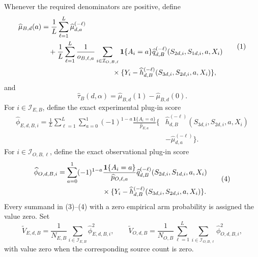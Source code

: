 Whenever the required denominators are positive, define
\[
\begin{aligned}
 \widehat\mu_{B,d}(a)
 &=\frac1L\sum_{\ell=1}^L\widehat\mu_{d,a}^{(-\ell)}\\
 &\quad+\frac1L\sum_{\ell=1}^L\frac1{o_{B,\ell,a}}
 \sum_{i\in\mathcal I_{O,B,\ell}}\mathbf 1\{A_i=a\}
 \widehat q_{d,B}^{(-\ell)}(S_{2d,i},S_{1d,i},a,X_i)\\
 &\hspace{35mm}\times
 \{Y_i-\widehat h_{d,B}^{(-\ell)}(S_{3d,i},S_{2d,i},a,X_i)\},
\end{aligned}                                               \tag{1}
\]
and
\[
 \widehat\tau_B(d,\alpha)
 =\widehat\mu_{B,d}(1)-\widehat\mu_{B,d}(0).               \tag{2}
\]
For \(i\in\mathcal I_{E,B}\), define the exact experimental plug-in score
\[
\begin{aligned}
 \widehat\phi_{E,d,B,i}
 =\frac1L\sum_{\ell=1}^L\sum_{a=0}^1(-1)^{1-a}
 \frac{\mathbf 1\{A_i=a\}}{\widehat p_{E,a}}
 \{&\widehat h_{d,B}^{(-\ell)}(S_{3d,i},S_{2d,i},a,X_i)\\
 &-\widehat\mu_{d,a}^{(-\ell)}\}.
\end{aligned}                                               \tag{3}
\]
For \(i\in\mathcal I_{O,B,\ell}\), define the exact observational plug-in score
\[
\begin{aligned}
 \widehat\phi_{O,d,B,i}
 &=\sum_{a=0}^1(-1)^{1-a}
 \frac{\mathbf 1\{A_i=a\}}{\widehat p_{O,\ell,a}}
 \widehat q_{d,B}^{(-\ell)}(S_{2d,i},S_{1d,i},a,X_i)\\
 &\hspace{22mm}\times
 \{Y_i-\widehat h_{d,B}^{(-\ell)}(S_{3d,i},S_{2d,i},a,X_i)\}.
\end{aligned}                                               \tag{4}
\]
Every summand in (3)--(4) with a zero empirical arm probability is assigned the value zero. Set
\[
 \widetilde V_{E,d,B}
 =\frac1{N_{E,B}}\sum_{i\in\mathcal I_{E,B}}
 \widehat\phi_{E,d,B,i}^2,
 \qquad
 \widetilde V_{O,d,B}
 =\frac1{N_{O,B}}\sum_{\ell=1}^L
 \sum_{i\in\mathcal I_{O,B,\ell}}
 \widehat\phi_{O,d,B,i}^2,                                 \tag{5}
\]
with value zero when the corresponding source count is zero.

